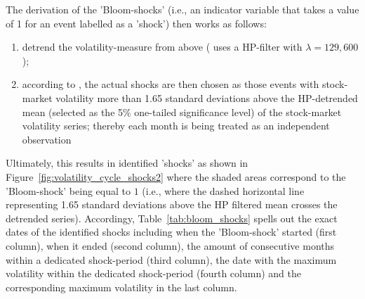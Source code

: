 \documentclass[a4paper,12pt,oneside,pointednumbers,bibtotoc,bigheadings,liststotoc]{scrbook}
\begin{document}
The derivation of the 'Bloom-shocks' (i.e., an indicator variable that takes a value of 1 for an event labelled as a 'shock') then works as follows:
\begin{enumerate}[i]
	\item detrend the volatility-measure from above (\citet{bloom:09} uses a HP-filter with $\lambda = 129,600$); 
	\item according to \citet{bloom:09}, the actual shocks are then chosen as those events with stock-market volatility more than 1.65 standard deviations above the HP-detrended mean (selected as the 5\% one-tailed significance level) of the stock-market volatility series; thereby each month is being treated as an independent observation
\end{enumerate}

Ultimately, this results in identified 'shocks' as shown in Figure~\ref{fig:volatility_cycle_shocks2} where the shaded areas correspond to the 'Bloom-shock' being equal to $1$ (i.e., where the dashed horizontal line representing 1.65 standard deviations above the HP filtered mean crosses the detrended series). Accordingy, Table~\ref{tab:bloom_shocks} spells out the exact dates of the identified shocks including when the 'Bloom-shock' started (first column), when it ended (second column), the amount of consecutive months within a dedicated shock-period (third column), the date with the maximum volatility within the dedicated shock-period (fourth column) and the corresponding maximum volatility in the last column.


\end{document}
